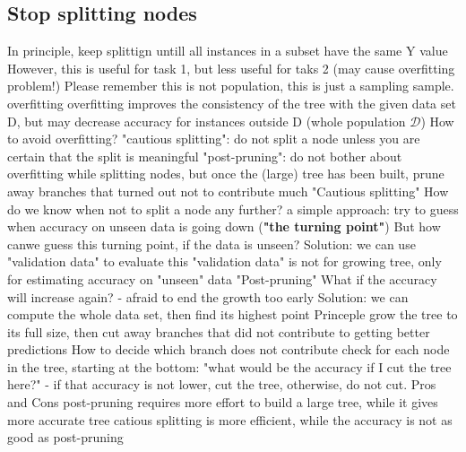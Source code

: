\subsection{Stop splitting nodes}
\begin{outline}
    \1 In principle, keep splittign untill all instances in a subset have the same Y value
        \2 However, this is useful for task 1, but less useful for taks 2 (may cause overfitting problem!)
        \2 Please remember this is not population, this is just a sampling sample.
    \1 overfitting
        \2 overfitting improves the consistency of the tree with the given data set D, but may decrease accuracy for instances outside D (whole population $\mathcal{D}$)
    \1 How to avoid overfitting?
        \2 "cautious splitting": do not split a node unless you are certain that the split is meaningful
        \2 "post-pruning": do not bother about overfitting while splitting nodes, but once the (large) tree has been built, prune away branches that turned out not to contribute much
    \1 "Cautious splitting"
        \2 How do we know when not to split a node any further?
            \3 a simple approach: try to guess when accuracy on unseen data is going down (\textbf{"the turning point"})
        \2 But how canwe guess this turning point, if the data is unseen?
            \3 Solution: we can use "validation data" to evaluate
            \3 this "validation data" is not for growing tree, only for estimating accuracy on "unseen" data
    \1 "Post-pruning"
        \2 What if the accuracy will increase again? - afraid to end the growth too early
            \3 Solution: we can compute the whole data set, then find its highest point
        \2 Princeple
            \3 grow the tree to its full size, then cut away branches that did not contribute to getting better predictions
            \3 How to decide which branch does not contribute
                \4 check for each node in the tree, starting at the bottom: "what would be the accuracy if I cut the tree here?" - if that accuracy is not lower, cut the tree, otherwise, do not cut.
    \1 Pros and Cons
        \2 post-pruning requires more effort to build a large tree, while it gives more accurate tree
        \2 catious splitting is more efficient, while the accuracy is not as good as post-pruning
\end{outline}

